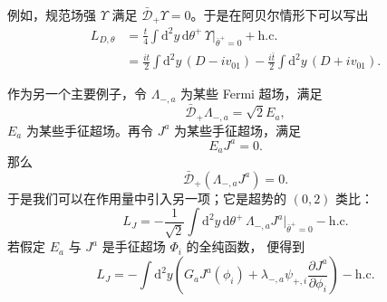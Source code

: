 例如，规范场强 $\Upsilon$ 满足 $\bar{\mathcal{D}}_+\Upsilon=0$。于是在阿贝尔情形下可以写出
\begin{equation}
\begin{aligned} L_{D,\theta} &= \frac{t}{4}\int\mathrm{d}^2y\,\mathrm{d}\theta^+\,\Upsilon\big|_{\bar\theta^+=0}+\mathrm{h.c.}\\ &= \frac{it}{2}\int\mathrm{d}^2y\,(D-iv_{01})-\frac{i\bar t}{2}\int\mathrm{d}^2y\,(D+iv_{01}). \end{aligned}\tag{6.20}
\end{equation}


作为另一个主要例子，令 $\Lambda_{-,a}$ 为某些 Fermi 超场，满足
\begin{equation}
\bar{\mathcal{D}}_+\Lambda_{-,a}=\sqrt2E_a,\tag{6.21}
\end{equation}
$E_a$ 为某些手征超场。再令 $J^a$ 为某些手征超场，满足
\begin{equation}
E_aJ^a=0.\tag{6.22}
\end{equation}
那么
\begin{equation}
\bar{\mathcal{D}}_+(\Lambda_{-,a}J^a)=0.\tag{6.23}
\end{equation}
于是我们可以在作用量中引入另一项；它是超势的 $(0,2)$ 类比：
\begin{equation} L_J=-\frac{1}{\sqrt2}\int\mathrm{d}^2y\,\mathrm{d}\theta^+\,\Lambda_{-,a}J^a\big|_{\bar\theta^+=0}-\mathrm{h.c.}\tag{6.24}
\end{equation}
若假定 $E_a$ 与 $J^a$ 是手征超场 $\Phi_i$ 的全纯函数，
\label{op:80}
便得到
\begin{equation} L_J=-\int\mathrm{d}^2y\left(G_aJ^a(\phi_i)+\lambda_{-,a}\psi_{+,i}\frac{\partial J^a}{\partial\phi_i}\right)-\mathrm{h.c.}\tag{6.25}
\end{equation}



